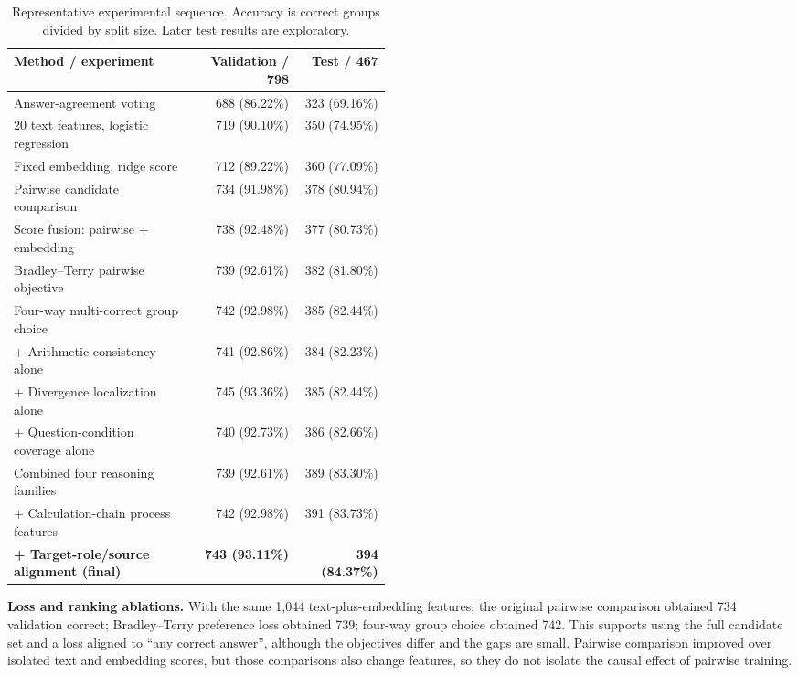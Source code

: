 \documentclass[10pt,a4paper]{article}
\newcommand{\pct}{\%}
\begin{document}
\begin{table}[ht]
\centering\small
\caption{Representative experimental sequence. Accuracy is correct groups divided by split size. Later test results are exploratory.}
\begin{tabular}{@{}p{0.48\linewidth}rr@{}}
\toprule
Method / experiment & Validation / 798 & Test / 467 \\
\midrule
Answer-agreement voting & 688 (86.22\pct) & 323 (69.16\pct) \\
20 text features, logistic regression & 719 (90.10\pct) & 350 (74.95\pct) \\
Fixed embedding, ridge score & 712 (89.22\pct) & 360 (77.09\pct) \\
Pairwise candidate comparison & 734 (91.98\pct) & 378 (80.94\pct) \\
Score fusion: pairwise + embedding & 738 (92.48\pct) & 377 (80.73\pct) \\
Bradley--Terry pairwise objective & 739 (92.61\pct) & 382 (81.80\pct) \\
Four-way multi-correct group choice & 742 (92.98\pct) & 385 (82.44\pct) \\
+ Arithmetic consistency alone & 741 (92.86\pct) & 384 (82.23\pct) \\
+ Divergence localization alone & 745 (93.36\pct) & 385 (82.44\pct) \\
+ Question-condition coverage alone & 740 (92.73\pct) & 386 (82.66\pct) \\
Combined four reasoning families & 739 (92.61\pct) & 389 (83.30\pct) \\
+ Calculation-chain process features & 742 (92.98\pct) & 391 (83.73\pct) \\
\textbf{+ Target-role/source alignment (final)} & \textbf{743 (93.11\pct)} & \textbf{394 (84.37\pct)} \\
\bottomrule
\end{tabular}
\end{table}

\textbf{Loss and ranking ablations.} With the same 1,044 text-plus-embedding features, the original pairwise comparison obtained 734 validation correct; Bradley--Terry preference loss obtained 739; four-way group choice obtained 742. This supports using the full candidate set and a loss aligned to ``any correct answer'', although the objectives differ and the gaps are small. Pairwise comparison improved over isolated text and embedding scores, but those comparisons also change features, so they do not isolate the causal effect of pairwise training.
\end{document}
